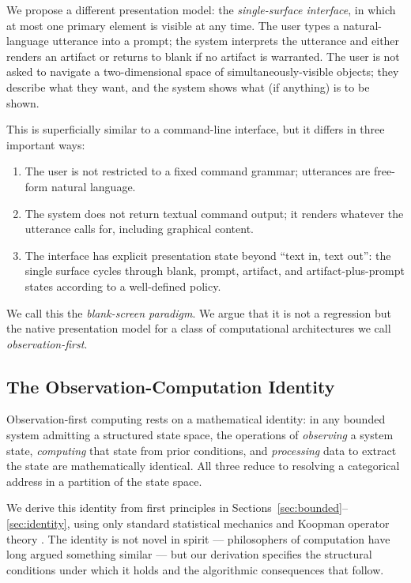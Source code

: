 \documentclass[11pt,twocolumn,a4paper]{article}
\theoremstyle{definition}
\theoremstyle{remark}
\begin{document}
We propose a different presentation model: the \emph{single-surface interface}, in which at most one primary element is visible at any time. The user types a natural-language utterance into a prompt; the system interprets the utterance and either renders an artifact or returns to blank if no artifact is warranted. The user is not asked to navigate a two-dimensional space of simultaneously-visible objects; they describe what they want, and the system shows what (if anything) is to be shown.

This is superficially similar to a command-line interface, but it differs in three important ways:
\begin{enumerate}
    \item The user is not restricted to a fixed command grammar; utterances are free-form natural language.
    \item The system does not return textual command output; it renders whatever the utterance calls for, including graphical content.
    \item The interface has explicit presentation state beyond ``text in, text out'': the single surface cycles through blank, prompt, artifact, and artifact-plus-prompt states according to a well-defined policy.
\end{enumerate}

We call this the \emph{blank-screen paradigm}. We argue that it is not a regression but the native presentation model for a class of computational architectures we call \emph{observation-first}.

\subsection{The Observation-Computation Identity}

Observation-first computing rests on a mathematical identity: in any bounded system admitting a structured state space, the operations of \emph{observing} a system state, \emph{computing} that state from prior conditions, and \emph{processing} data to extract the state are mathematically identical. All three reduce to resolving a categorical address in a partition of the state space.

We derive this identity from first principles in Sections~\ref{sec:bounded}--\ref{sec:identity}, using only standard statistical mechanics \citep{boltzmann1872further, shannon1948mathematical} and Koopman operator theory \citep{koopman1931hamiltonian, mezic2005spectral}. The identity is not novel in spirit --- philosophers of computation have long argued something similar \citep{chaitin1975randomness, wheeler1990information} --- but our derivation specifies the structural conditions under which it holds and the algorithmic consequences that follow.
\end{document}
